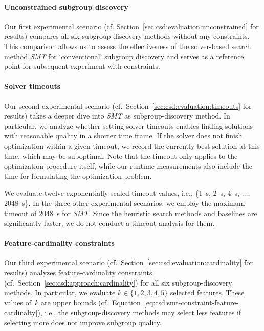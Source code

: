 \documentclass{article}
\theoremstyle{definition}
\begin{document}
\paragraph{Unconstrained subgroup discovery}

Our first experimental scenario (cf. Section~\ref{sec:csd:evaluation:unconstrained} for results) compares all six subgroup-discovery methods without any constraints.
This comparison allows us to assess the effectiveness of the solver-based search method \emph{SMT} for `conventional' subgroup discovery and serves as a reference point for subsequent experiment with constraints.

\paragraph{Solver timeouts}

Our second experimental scenario (cf.~Section~\ref{sec:csd:evaluation:timeouts} for results) takes a deeper dive into \emph{SMT} as subgroup-discovery method.
In particular, we analyze whether setting solver timeouts enables finding solutions with reasonable quality in a shorter time frame.
If the solver does not finish optimization within a given timeout, we record the currently best solution at this time, which may be suboptimal.
Note that the timeout only applies to the optimization procedure itself, while our runtime measurements also include the time for formulating the optimization problem.

We evaluate twelve exponentially scaled timeout values, i.e., \{1~s, 2~s, 4~s, $\dots$, 2048~s\}.
In the three other experimental scenarios, we employ the maximum timeout of 2048~s for \emph{SMT}.
Since the heuristic search methods and baselines are significantly faster, we do not conduct a timeout analysis for them.

\paragraph{Feature-cardinality constraints}

Our third experimental scenario (cf.~Section~\ref{sec:csd:evaluation:cardinality} for results) analyzes feature-cardinality constraints (cf.~Section~\ref{sec:csd:approach:cardinality}) for all six subgroup-discovery methods.
In particular, we evaluate $k \in \{1, 2, 3, 4, 5\}$ selected features.
These values of~$k$ are upper bounds (cf.~Equation~\ref{eq:csd:smt-constraint-feature-cardinalty}), i.e., the subgroup-discovery methods may select less features if selecting more does not improve subgroup quality.
\end{document}
